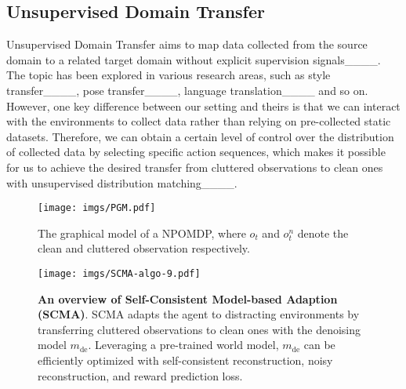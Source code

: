 
\subsection{Unsupervised Domain Transfer}
Unsupervised Domain Transfer aims to map data collected from the source domain to a related target domain without explicit supervision signals____. The topic has been explored in various research areas, such as style transfer____, pose transfer____, language translation____ and so on. However, one key difference between our setting and theirs is that we can interact with the environments to collect data rather than relying on pre-collected static datasets. Therefore, we can obtain a certain level of control over the distribution of collected data by selecting specific action sequences, which makes it possible for us to achieve the desired transfer from cluttered observations to clean ones with unsupervised distribution matching____.


\begin{figure}
    \centering
    \texttt{[image: imgs/PGM.pdf]}
    \caption{The graphical model of a NPOMDP, where $o_t$ and $o^n_t$ denote the clean and cluttered observation respectively.}
    \vspace{-1em}
    \label{fig_pgm}
\end{figure}

\begin{figure*}[tb]
\centering
\centerline{\texttt{[image: imgs/SCMA-algo-9.pdf]}}
\caption{\textbf{An overview of Self-Consistent Model-based Adaption (SCMA)}. SCMA adapts the agent to distracting environments by transferring cluttered observations to clean ones with the denoising model $m_{\mathrm{de}}$. Leveraging a pre-trained world model, $m_{\mathrm{de}}$ can be efficiently optimized with self-consistent reconstruction, noisy reconstruction, and reward prediction loss.}
\label{fig_scma_algo}
\vspace{-1.2em}
\end{figure*}